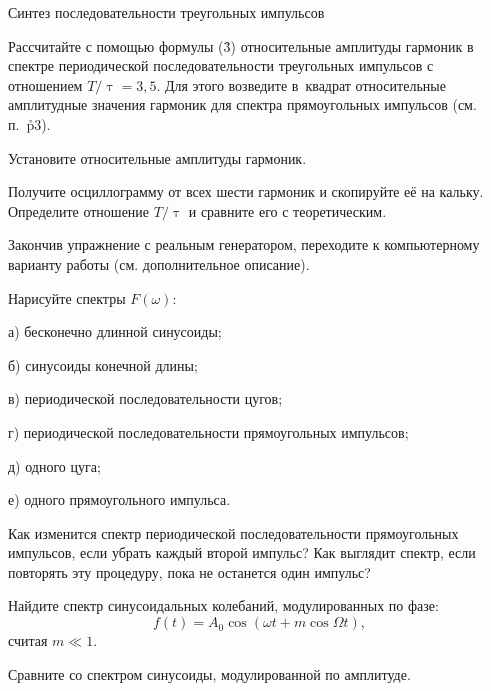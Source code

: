 \begin{lab:task}
\zn Синтез последовательности треугольных импульсов

\n Рассчитайте с помощью формулы (\r3) относительные амплитуды гармоник в спектре периодической последовательности
треугольных импульсов с отношением $T/\uptau=3,5$. Для этого возведите в~квадрат относительные амплитудные значения
гармоник для спектра прямоугольных импульсов (см. п.~\r{p3}).

\n Установите относительные амплитуды гармоник.

\n Получите осциллограмму от всех шести гармоник и скопируйте её на кальку. Определите отношение $T/\uptau$ и сравните
его с теоретическим.

\n Закончив упражнение с реальным генератором, переходите к компьютерному варианту работы (см. дополнительное описание).
\end{lab:task}

{\small

\kv

\n Нарисуйте спектры $F(\omega)$:

а) бесконечно длинной синусоиды;

б) синусоиды конечной длины;

в) периодической последовательности цугов;

г) периодической последовательности прямоугольных импульсов;

д) одного цуга;

е) одного прямоугольного импульса.

\n Как изменится спектр периодической последовательности прямоугольных импульсов, если убрать каждый второй импульс? Как
выглядит спектр, если повторять эту процедуру, пока не останется один импульс?


\n Найдите спектр синусоидальных колебаний, модулированных по фазе:
\[
f(t)=A_0\cos(\omega t + m \cos \Omega t),
\]
считая $m\ll 1$.

Сравните со спектром синусоиды, модулированной по амплитуде.




}
